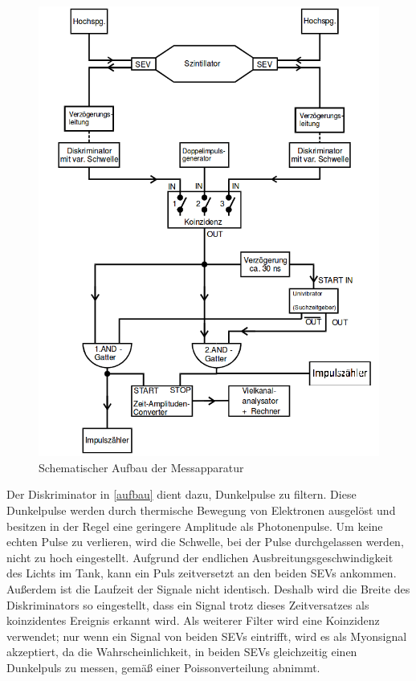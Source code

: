 \begin{figure}
  \includegraphics[width=\textwidth]{img/aufbau.png}
  \caption{Schematischer Aufbau der Messapparatur \cite{FP}}
  \label{aufbau}
\end{figure}

Der Diskriminator in \autoref{aufbau} dient dazu, Dunkelpulse zu filtern. Diese Dunkelpulse werden durch thermische Bewegung von Elektronen ausgelöst und besitzen in der Regel eine geringere Amplitude als Photonenpulse. Um keine echten Pulse zu verlieren, wird die Schwelle, bei der Pulse durchgelassen werden, nicht zu hoch eingestellt. Aufgrund der endlichen Ausbreitungsgeschwindigkeit des Lichts im Tank, kann ein Puls zeitversetzt an den beiden SEVs ankommen. Außerdem ist die Laufzeit der Signale nicht identisch. Deshalb wird die Breite des Diskriminators so eingestellt, dass ein Signal trotz dieses Zeitversatzes als koinzidentes Ereignis erkannt wird. Als weiterer Filter wird eine Koinzidenz verwendet; nur wenn ein Signal von beiden SEVs eintrifft, wird es als Myonsignal akzeptiert, da die Wahrscheinlichkeit, in beiden SEVs gleichzeitig einen Dunkelpuls zu messen, gemäß einer Poissonverteilung abnimmt.

